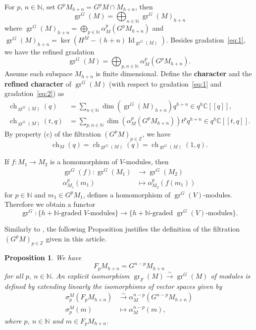 \documentclass[12pt, a4paper]{article}
\newtheorem{proposition}{Proposition}
\DeclareMathOperator{\Id}{Id}
\DeclareMathOperator{\gr}{gr}
\DeclareMathOperator{\ch}{ch}
\begin{document}
For $p$, $n \in \mathbb{N}$, set $G^pM_{h + n} = G^pM \cap M_{h + n}$, then
\begin{equation}
  \label{eq:1}
  \gr^G(M)=\bigoplus_{n\in \mathbb{N}}\gr^G(M)_{h+n}
\end{equation}
where $\gr^G(M)_{h + n} = \bigoplus_{p \in \mathbb{N}}\alpha^p_M(G^pM_{h + n})$ and $\gr^G(M)_{h + n} = \ker(H^M - (h + n)\Id_{\gr^G(M)})$.
Besides gradation~\eqref{eq:1}, we have the refined gradation
\begin{equation}
  \label{eq:2}
  \gr^G(M) = \bigoplus_{p, n \in \mathbb{N}}\alpha^p_M(G^pM_{h + n}).
\end{equation}
Assume each subspace $M_{h + n}$ is finite dimensional.
Define the \textbf{character} and the \textbf{refined character} of $\gr^G(M)$ (with respect to gradation~\eqref{eq:1} and gradation~\eqref{eq:2}) as
\begin{align*}
  \ch_{\gr^G(M)}(q) &= \sum_{n \in \mathbb{N}}\dim(\gr^G(M)_{h + n})q^{h + n} \in q^h\mathbb{C}[[q]],\\
  \ch_{\gr^G(M)}(t, q) &= \sum_{p, n \in \mathbb{N}}\dim(\alpha^p_M(G^pM_{h + n}))t^pq^{h + n} \in q^{h}\mathbb{C}[[t, q]].
\end{align*}
By property (c) of the filtration $(G^pM)_{p\in \mathbb{Z}}$, we have
\begin{equation*}
  \ch_M(q) = \ch_{\gr^G(M)}(q) = \ch_{\gr^G(M)}(1, q).
\end{equation*}

If $f: M_1 \to M_2$ is a homomorphism of $V$-modules, then
\begin{align*}
  \gr^G(f): \gr^G(M_1) &\to \gr^G(M_2) \\
  \alpha^p_{M_1}(m_1) &\mapsto \alpha^p_{M_2}(f(m_1))
\end{align*}
for $p\in \mathbb{N}$ and $m_1\in G^pM_1$, defines a homomorphism of $\gr^G(V)$-modules.
Therefore we obtain a functor
\begin{equation*}
  \gr^G: \{\text{$h + \mathbb{N}$-graded $V$-modules}\} \to \{\text{$h + \mathbb{N}$-graded $\gr^G(V)$-modules}\}.
\end{equation*}

Similarly to , the following Proposition justifies the definition of the filtration $(G^pM)_{p\in \mathbb{Z}}$ given in this article.

\begin{proposition}
  \label{prp:4}
  We have
  \begin{equation*}
    F_pM_{h + n} = G^{n - p}M_{h + n}
  \end{equation*}
  for all $p$, $n \in \mathbb{N}$.
  An explicit isomorphism $\gr_F(M) \xrightarrow{\sim} \gr^G(M)$ of modules is defined by extending linearly the isomorphisms of vector spaces given by
  \begin{align*}
    \sigma^M_p(F_pM_{h + n}) &\xrightarrow{\sim} \alpha^{n - p}_M(G^{n - p}M_{h + n}) \\
    \sigma^M_p(m) &\mapsto \alpha^{n - p}_M(m),
  \end{align*}
  where $p$, $n\in \mathbb{N}$ and $m \in F_pM_{h + n}$.
\end{proposition}
\end{document}
